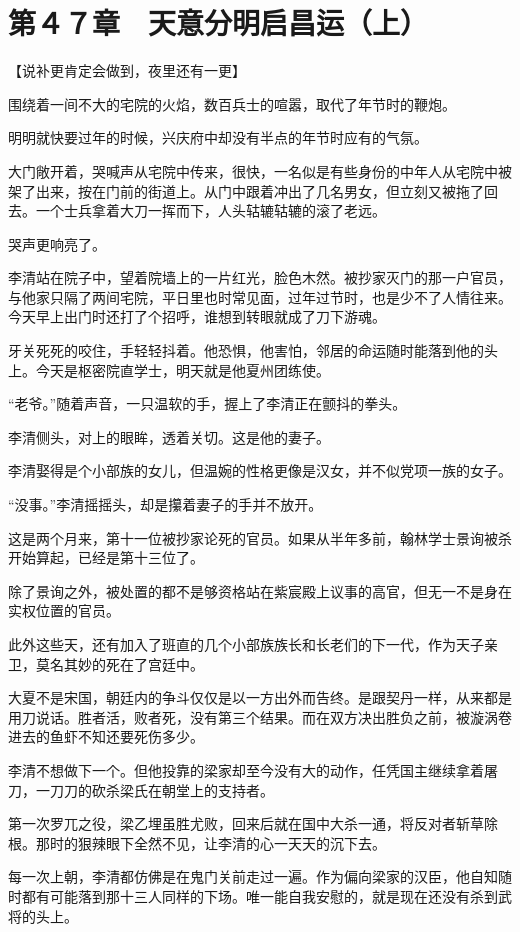 \section{第４７章　天意分明启昌运（上）}

【说补更肯定会做到，夜里还有一更】

围绕着一间不大的宅院的火焰，数百兵士的喧嚣，取代了年节时的鞭炮。

明明就快要过年的时候，兴庆府中却没有半点的年节时应有的气氛。

大门敞开着，哭喊声从宅院中传来，很快，一名似是有些身份的中年人从宅院中被架了出来，按在门前的街道上。从门中跟着冲出了几名男女，但立刻又被拖了回去。一个士兵拿着大刀一挥而下，人头轱辘轱辘的滚了老远。

哭声更响亮了。

李清站在院子中，望着院墙上的一片红光，脸色木然。被抄家灭门的那一户官员，与他家只隔了两间宅院，平日里也时常见面，过年过节时，也是少不了人情往来。今天早上出门时还打了个招呼，谁想到转眼就成了刀下游魂。

牙关死死的咬住，手轻轻抖着。他恐惧，他害怕，邻居的命运随时能落到他的头上。今天是枢密院直学士，明天就是他夏州团练使。

“老爷。”随着声音，一只温软的手，握上了李清正在颤抖的拳头。

李清侧头，对上的眼眸，透着关切。这是他的妻子。

李清娶得是个小部族的女儿，但温婉的性格更像是汉女，并不似党项一族的女子。

“没事。”李清摇摇头，却是攥着妻子的手并不放开。

这是两个月来，第十一位被抄家论死的官员。如果从半年多前，翰林学士景询被杀开始算起，已经是第十三位了。

除了景询之外，被处置的都不是够资格站在紫宸殿上议事的高官，但无一不是身在实权位置的官员。

此外这些天，还有加入了班直的几个小部族族长和长老们的下一代，作为天子亲卫，莫名其妙的死在了宫廷中。

大夏不是宋国，朝廷内的争斗仅仅是以一方出外而告终。是跟契丹一样，从来都是用刀说话。胜者活，败者死，没有第三个结果。而在双方决出胜负之前，被漩涡卷进去的鱼虾不知还要死伤多少。

李清不想做下一个。但他投靠的梁家却至今没有大的动作，任凭国主继续拿着屠刀，一刀刀的砍杀梁氏在朝堂上的支持者。

第一次罗兀之役，梁乙埋虽胜尤败，回来后就在国中大杀一通，将反对者斩草除根。那时的狠辣眼下全然不见，让李清的心一天天的沉下去。

每一次上朝，李清都仿佛是在鬼门关前走过一遍。作为偏向梁家的汉臣，他自知随时都有可能落到那十三人同样的下场。唯一能自我安慰的，就是现在还没有杀到武将的头上。


